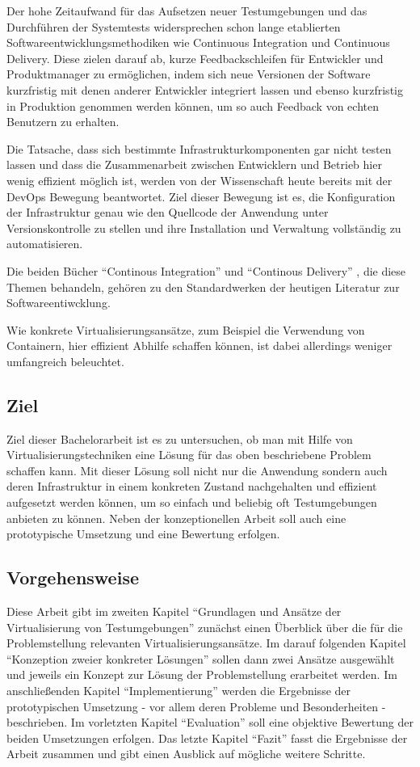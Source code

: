 Der hohe Zeitaufwand für das Aufsetzen neuer Testumgebungen und das Durchführen der Systemtests widersprechen schon lange etablierten Softwareentwicklungsmethodiken wie Continuous Integration und Continuous Delivery. Diese zielen darauf ab, kurze Feedbackschleifen für Entwickler und Produktmanager zu ermöglichen, indem sich neue Versionen der Software kurzfristig mit denen anderer Entwickler integriert lassen und ebenso kurzfristig in Produktion genommen werden können, um so auch Feedback von echten Benutzern zu erhalten.

Die Tatsache, dass sich bestimmte Infrastrukturkomponenten gar nicht testen lassen und dass die Zusammenarbeit zwischen Entwicklern und Betrieb hier wenig effizient möglich ist, werden von der Wissenschaft heute bereits mit der DevOps Bewegung beantwortet. Ziel dieser Bewegung ist es, die Konfiguration der Infrastruktur genau wie den Quellcode der Anwendung unter Versionskontrolle zu stellen und ihre Installation und Verwaltung vollständig zu automatisieren.

Die beiden Bücher "`Continous Integration"' \citep{DuvMatAnd07} und "`Continous Delivery"' \citep{HumFar10}, die diese Themen behandeln, gehören zu den Standardwerken der heutigen Literatur zur Softwareentiwcklung.

Wie konkrete Virtualisierungsansätze, zum Beispiel die Verwendung von Containern, hier effizient Abhilfe schaffen können, ist dabei allerdings weniger umfangreich beleuchtet.

\subsection{Ziel}

Ziel dieser Bachelorarbeit ist es zu untersuchen, ob man mit Hilfe von Virtualisierungstechniken eine Lösung für das oben beschriebene Problem schaffen kann. Mit dieser Lösung soll nicht nur die Anwendung sondern auch deren Infrastruktur in einem konkreten Zustand nachgehalten und effizient aufgesetzt werden können, um so einfach und beliebig oft Testumgebungen anbieten zu können. Neben der konzeptionellen Arbeit soll auch eine prototypische Umsetzung und eine Bewertung erfolgen.

\subsection{Vorgehensweise}

Diese Arbeit gibt im zweiten Kapitel "`Grundlagen und Ansätze der Virtualisierung von Testumgebungen"' zunächst einen Überblick über die für die Problemstellung relevanten Virtualisierungsansätze. Im darauf folgenden Kapitel "`Konzeption zweier konkreter Lösungen"' sollen dann zwei Ansätze ausgewählt und jeweils ein Konzept zur Lösung der Problemstellung erarbeitet werden. Im anschließenden Kapitel "`Implementierung"' werden die Ergebnisse der prototypischen Umsetzung - vor allem deren Probleme und Besonderheiten - beschrieben. Im vorletzten Kapitel "`Evaluation"' soll eine objektive Bewertung der beiden Umsetzungen erfolgen. Das letzte Kapitel "`Fazit"' fasst die Ergebnisse der Arbeit zusammen und gibt einen Ausblick auf mögliche weitere Schritte.
